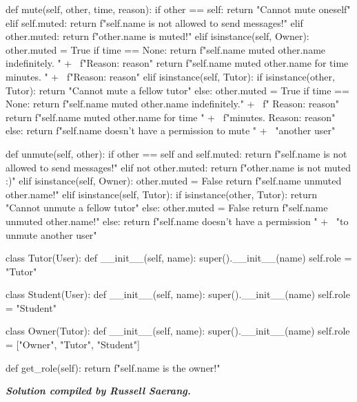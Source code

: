 \begin{python}
    def mute(self, other, time, reason):
        if other == self:
            return "Cannot mute oneself"
        elif self.muted:
            return f"{self.name} is not allowed to send messages!"
        elif other.muted:
            return f"{other.name} is muted!"
        elif isinstance(self, Owner):
            other.muted = True
            if time == None:
                return f"{self.name} muted {other.name} indefinitely. " + \
                       f"Reason: {reason}"
            return f"{self.name} muted {other.name} for {time} minutes. " + \
                   f"Reason: {reason}"
        elif isinstance(self, Tutor):
            if isinstance(other, Tutor):
                return "Cannot mute a fellow tutor"
            else:
                other.muted = True
                if time == None:
                    return f"{self.name} muted {other.name} indefinitely." + \
                           f" Reason: {reason}"
                return f"{self.name} muted {other.name} for {time} " + \
                       f"minutes. Reason: {reason}"
        else:
            return f"{self.name} doesn't have a permission to mute " + \
                   "another user"

    def unmute(self, other):
        if other == self and self.muted:
            return f"{self.name} is not allowed to send messages!"
        elif not other.muted:
            return f"{other.name} is not muted :)"
        elif isinstance(self, Owner):
            other.muted = False
            return f"{self.name} unmuted {other.name}!"
        elif isinstance(self, Tutor):
            if isinstance(other, Tutor):
                return "Cannot unmute a fellow tutor"
            else:
                other.muted = False
                return f"{self.name} unmuted {other.name}!"
        else:
            return f"{self.name} doesn't have a permission " + \
                   "to unmute another user"

class Tutor(User):
    def __init__(self, name):
        super().__init__(name)
        self.role = "Tutor"

class Student(User):
    def __init__(self, name):
        super().__init__(name)
        self.role = "Student"

class Owner(Tutor):
    def __init__(self, name):
        super().__init__(name)
        self.role = ["Owner", "Tutor", "Student"]

    def get_role(self):
        return f"{self.name} is the owner!"
\end{python}

\begin{flushright}
\vspace{2 cm}\textbf{\textit{Solution compiled by Russell Saerang.}}
\end{flushright}
